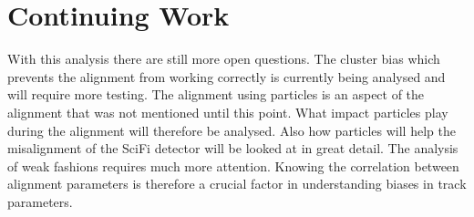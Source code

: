 \chapter{Continuing Work}
\label{sec:continue}

With this analysis there are still more open questions. The cluster bias which prevents the alignment from working correctly is currently being analysed and will require more testing.
The alignment using particles is an aspect of the alignment that was not mentioned until this point. What impact particles play during the alignment will therefore be analysed.
Also how particles will help the misalignment of the SciFi detector will be looked at in great detail.
The analysis of weak fashions requires much more attention. Knowing the correlation between alignment parameters is therefore a crucial factor in understanding biases in track parameters.
